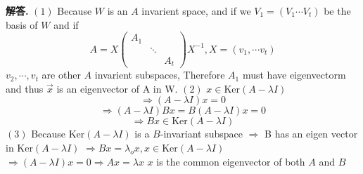 \documentclass[12pt, a4paper, oneside]{article}
\newenvironment{solution}{\par\noindent\textbf{解答. }}{\par}
\begin{document}
\begin{CJK}{UTF8}{gbsn}
\begin{solution} \newline
  $(1)$ Because $W$ is an $A$ invarient space, and if we  $V_1 = (V_{1} \cdots V_{t})$ be the basis of $W$ and if 
  $$ A = X \begin{pmatrix}
    A_1 & & \\
    & \ddots & \\
    & & A_t  
  \end{pmatrix} X^{-1}, X = (v_1, \cdots v_t) 
  $$ 
  $v_2, \cdots ,v_t$ are other $A$ invarient subspaces, Therefore $A_1$ must have eigenvectorm and thus $\vec{x}$ is an eigenvector of A in W. \newline
  $(2)$ $x \in \text{Ker}(A - \lambda I)$  \newline
  $$ \Rightarrow (A-\lambda I)x = 0$$
  $$ \Rightarrow (A-\lambda I)Bx = B(A - \lambda I)x = 0$$
  $$ \Rightarrow Bx \in \text{Ker} (A - \lambda I) $$
  $(3)$ Because $\text{Ker}(A-\lambda I)$ is a $B$-invariant subspace \newline
  $\Rightarrow$ B has an eigen vector in $\text{Ker}(A - \lambda I)$ \newline
  $\Rightarrow Bx = \lambda_o x, x \in \text{Ker}(A-\lambda I)$ \newline
  $\Rightarrow (A - \lambda I) x = 0 \Rightarrow Ax = \lambda x$ \newline
  $x$ is the common eigenvector of both $A$ and $B$ 
\end{solution}

\vfill
\vspace{0.25\textheight}
\newpage





\end{CJK}
\end{document}
